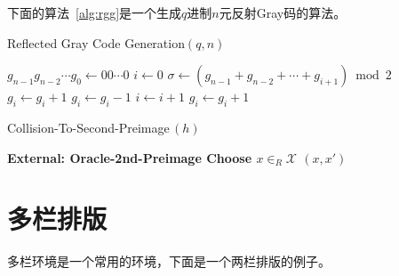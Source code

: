 下面的算法~\ref{alg:rgg}是一个生成$q$进制$n$元反射Gray码的算法。
\begin{algorithm}
\caption{\sc Reflected Gray Code Generation$(q, n)$}
\label{alg:genGraycode}
\begin{algorithmic}
\label{alg:rgg}
\STATE $g_{n-1}g_{n-2}\cdots g_{0}\longleftarrow 00\cdots 0$
    \STATE $i\leftarrow 0$
    \STATE $\sigma \leftarrow (g_{n-1}+g_{n-2}+\cdots +g_{i+1})\bmod 2$
        \STATE $g_{i} \leftarrow g_{i}+1$
        \STATE $g_{i}\leftarrow g_{i}-1$
    \ENDIF
    \STATE $i \leftarrow i+1$
        \STATE $g_{i} \leftarrow g_{i}+1$
    \ENDIF
\ENDWHILE
\end{algorithmic}
\end{algorithm}
%
\begin{algorithm}
\caption{{\sc Collision-To-Second-Preimage}\,$(h)$}
\label{algo:c2sec}
\begin{algorithmic}
\STATE \bf{External: }{\sc Oracle-2nd-Preimage}
\STATE Choose $x\in_R\mathcal{X}$
    \RETURN $(x,x')$
\ENDIF
\end{algorithmic}
\end{algorithm}
\section{多栏排版}
多栏环境是一个常用的环境，下面是一个两栏排版的例子。
\begin{Parallel}[v]{0.38\textwidth}{}
\end{Parallel}
